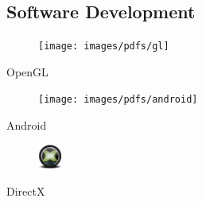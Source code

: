 \begin{aside}
    \subsection{Software Development}
      \begin{center}
        \vspace{2mm}%
        \begin{minipage}[t]{12mm}
          \vspace{-6mm}
          \begin{center}
            \begin{figure}
              \texttt{[image: images/pdfs/gl]}
            \end{figure}
            \vspace{2.50mm}
            \small{OpenGL}
          \end{center}
        \end{minipage}\hspace{0.5mm}%
        \vspace{2mm}%
        \begin{minipage}[t]{12mm}
          \begin{center}
            \begin{figure}
              \texttt{[image: images/pdfs/android]}
            \end{figure}
            \small{Android}
          \end{center}
        \end{minipage}\hspace{0.5mm}%
        \begin{minipage}[t]{12mm}
          \begin{center}
            \begin{figure}
              \includegraphics[width=8mm]{images/directx}
            \end{figure}
            \small{DirectX}
          \end{center}
        \end{minipage}\hspace{0.5mm}%
      \end{center}


\end{aside}
